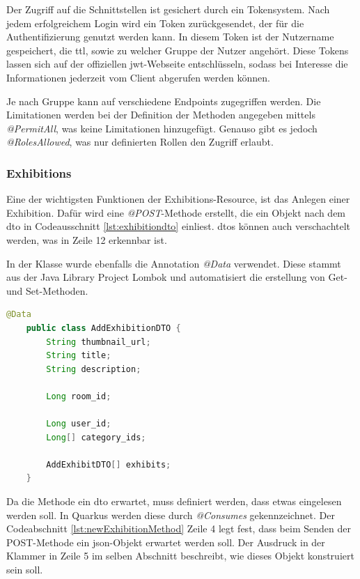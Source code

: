 Der Zugriff auf die Schnittstellen ist gesichert durch ein Tokensystem. 
Nach jedem erfolgreichem Login wird ein Token zurückgesendet, der für die Authentifizierung genutzt werden kann. 
In diesem Token ist der Nutzername gespeichert, die \gls{ttl}, sowie zu welcher Gruppe der Nutzer angehört. 
Diese Tokens lassen sich auf der offiziellen \gls{jwt}-Webseite entschlüsseln, sodass bei Interesse die Informationen jederzeit vom Client abgerufen werden können.

Je nach Gruppe kann auf verschiedene Endpoints zugegriffen werden. 
Die Limitationen werden bei der Definition der Methoden angegeben mittels \emph{@PermitAll}, was keine Limitationen hinzugefügt.
Genauso gibt es jedoch \emph{@RolesAllowed}, was nur definierten Rollen den Zugriff erlaubt.  

\subsubsection{Exhibitions}
Eine der wichtigsten Funktionen der Exhibitions-Resource, ist das Anlegen einer Exhibition. 
Dafür wird eine \emph{@POST}-Methode erstellt, die ein Objekt nach dem \gls{dto} in Codeausschnitt \ref{lst:exhibitiondto} einliest.
\gls{dto}s können auch verschachtelt werden, was in Zeile 12 erkennbar ist. 

In der Klasse wurde ebenfalls die Annotation \emph{@Data} verwendet. 
Diese stammt aus der Java Library Project Lombok und automatisiert die erstellung von Get- und Set-Methoden. 
\cite{Lambok}

\begin{lstlisting}[label=lst:exhibitiondto, language=Java, caption=Exhibition DTO]
    @Data
    public class AddExhibitionDTO {
        String thumbnail_url;
        String title;
        String description;

        Long room_id;

        Long user_id;
        Long[] category_ids;

        AddExhibitDTO[] exhibits;
    }
\end{lstlisting}

Da die Methode ein \gls{dto} erwartet, muss definiert werden, dass etwas eingelesen werden soll. 
In Quarkus werden diese durch \emph{@Consumes} gekennzeichnet. 
Der Codeabschnitt \ref{lst:newExhibitionMethod} Zeile 4 legt fest, dass beim Senden der POST-Methode ein \gls{json}-Objekt erwartet werden soll. 
Der Ausdruck in der Klammer in Zeile 5 im selben Abschnitt beschreibt, wie dieses Objekt konstruiert sein soll.

